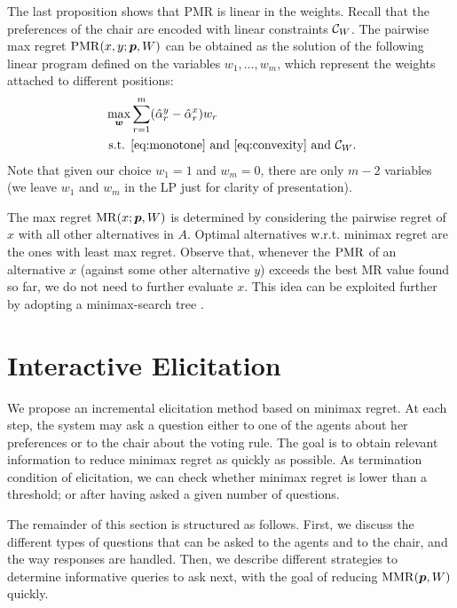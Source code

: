 \documentclass{article}
\begin{document}
The last proposition shows that PMR is linear in the weights.
Recall that the preferences of the chair are encoded with linear constraints $\mathcal{C}_{W}$.
The pairwise max regret $\operatorname{PMR}(x,y; {\bm{p}},W)$ can be obtained as the solution of the following linear program defined on the variables $w_1, …, w_m$, which represent the weights attached to different positions:
\begin{align}
	\max_{\w} & \sum_{r=1}^m (\hat{\alpha}_{r}^{y} - \hat{\alpha}_{r}^{x}) w_{r}\\
	\text{ s.t. } & \text{\cref{eq:monotone}} \text{ and } \text{\cref{eq:convexity}} \text{ and } \Co_W.
\end{align}
Note that given our choice $w_{1}=1$ and $w_{m}=0$, there are only $m-2$ variables 
(we leave $w_{1}$ and $w_{m}$ in the LP just for clarity of presentation).

The max regret $\operatorname{MR}(x; {\bm{p}}, W)$ is determined by considering the pairwise regret of $x$ with all other alternatives in $A$.
Optimal alternatives w.r.t. minimax regret are the ones with least max regret. 
Observe that, whenever the $\operatorname{PMR}$ of an alternative $x$ (against some other alternative $y$) exceeds the best MR value found so far, we do not need to further evaluate $x$. 
This idea can be exploited further by adopting a minimax-search tree \citep{Braziunas2012}.

\section{Interactive Elicitation} 
\label{sec:elicit}
We propose an incremental elicitation method based on minimax regret.
At each step, the system may ask a question either to one of the agents about her preferences or to the chair about the voting rule. 
The goal is to obtain relevant information to reduce minimax regret as quickly as possible.
As termination condition of elicitation, we can check whether minimax regret is lower than a threshold; or after having asked a given number of questions.

The remainder of this section is structured as follows.
First, we discuss the different types of questions that can be asked to the agents and to the chair, and the way responses are handled.
Then, we describe different strategies to determine informative queries to ask next, with the goal of reducing $\operatorname{MMR}({\bm{p}},W)$ quickly.
\end{document}
